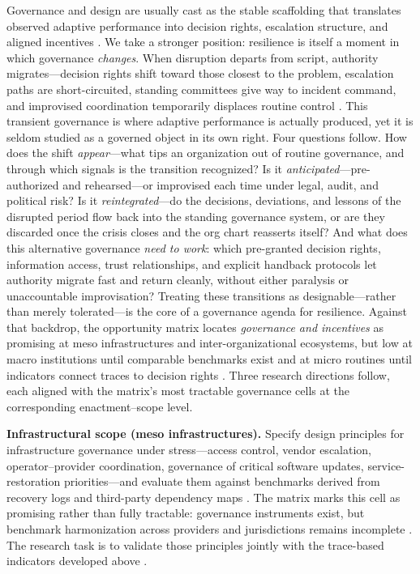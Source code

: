 Governance and design are usually cast as the stable scaffolding that translates observed adaptive performance into decision rights, escalation structure, and aligned incentives \autocite{boin2013resilient,calder2021iso,bcbs2021operational,nist2024csf}. We take a stronger position: resilience is itself a moment in which governance \emph{changes}. When disruption departs from script, authority migrates---decision rights shift toward those closest to the problem, escalation paths are short-circuited, standing committees give way to incident command, and improvised coordination temporarily displaces routine control \autocite{weick2011managing,boin2013resilient}. This transient governance is where adaptive performance is actually produced, yet it is seldom studied as a governed object in its own right. Four questions follow. How does the shift \emph{appear}---what tips an organization out of routine governance, and through which signals is the transition recognized? Is it \emph{anticipated}---pre-authorized and rehearsed---or improvised each time under legal, audit, and political risk? Is it \emph{reintegrated}---do the decisions, deviations, and lessons of the disrupted period flow back into the standing governance system, or are they discarded once the crisis closes and the org chart reasserts itself? And what does this alternative governance \emph{need to work}: which pre-granted decision rights, information access, trust relationships, and explicit handback protocols let authority migrate fast and return cleanly, without either paralysis or unaccountable improvisation? Treating these transitions as designable---rather than merely tolerated---is the core of a governance agenda for resilience. Against that backdrop, the opportunity matrix locates \emph{governance and incentives} as promising at meso infrastructures and inter-organizational ecosystems, but low at macro institutions until comparable benchmarks exist and at micro routines until indicators connect traces to decision rights \autocite{skopik2016problem,bcbs2021operational,nist2024csf}. Three research directions follow, each aligned with the matrix's most tractable governance cells at the corresponding enactment--scope level.

\textbf{Infrastructural scope (meso infrastructures).} Specify design principles for infrastructure governance under stress---access control, vendor escalation, operator--provider coordination, governance of critical software updates, service-restoration priorities---and evaluate them against benchmarks derived from recovery logs and third-party dependency maps \autocite{ecb2018tiber,hausken2020cyber}. The matrix marks this cell as promising rather than fully tractable: governance instruments exist, but benchmark harmonization across providers and jurisdictions remains incomplete \autocite{bcbs2021operational,european2022regulation}. The research task is to validate those principles jointly with the trace-based indicators developed above \autocite{kuypers2018designing}.

